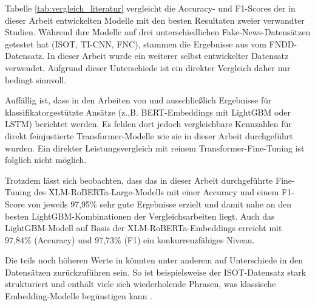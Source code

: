 Tabelle \ref{tab:vergleich_literatur} vergleicht die Accuracy- und F1-Scores der in dieser Arbeit entwickelten Modelle mit den besten Resultaten zweier 
verwandter Studien. Während \cite{Essa:2023aa} ihre Modelle auf drei unterschiedlichen Fake-News-Datensätzen getestet hat 
(ISOT, TI-CNN, FNC), stammen die Ergebnisse aus \cite{V_G_2024} vom FNDD-Datensatz. In dieser Arbeit wurde ein weiterer selbst entwickelter Datensatz verwendet. 
Aufgrund dieser Unterschiede ist ein direkter Vergleich daher nur bedingt sinnvoll.

Auffällig ist, dass in den Arbeiten von \cite{Essa:2023aa} und \cite{V_G_2024} ausschließlich Ergebnisse für klassifikatorgestützte Ansätze 
(z.,B. BERT-Embeddings mit LightGBM oder LSTM) berichtet werden. Es fehlen dort jedoch vergleichbare Kennzahlen für direkt feinjustierte Transformer-Modelle 
wie sie in dieser Arbeit durchgeführt wurden. Ein direkter Leistungsvergleich mit reinem Transformer-Fine-Tuning ist folglich nicht möglich.

Trotzdem lässt sich beobachten, dass das in dieser Arbeit durchgeführte Fine-Tuning des XLM-RoBERTa-Large-Modells mit einer Accuracy und einem F1-Score von 
jeweils 97,95\% sehr gute Ergebnisse erzielt und damit nahe an den besten LightGBM-Kombinationen der Vergleichsarbeiten liegt. 
Auch das LightGBM-Modell auf Basis der XLM-RoBERTa-Embeddings erreicht mit 97,84\% (Accuracy) und 97,73\% (F1) ein konkurrenzfähiges Niveau.

Die teils noch höheren Werte in \cite{Essa:2023aa} könnten unter anderem auf Unterschiede in den Datensätzen zurückzuführen sein. 
So ist beispielsweise der ISOT-Datensatz stark strukturiert und enthält viele sich wiederholende Phrasen, was klassische Embedding-Modelle begünstigen kann \cite{s22186970}. 

